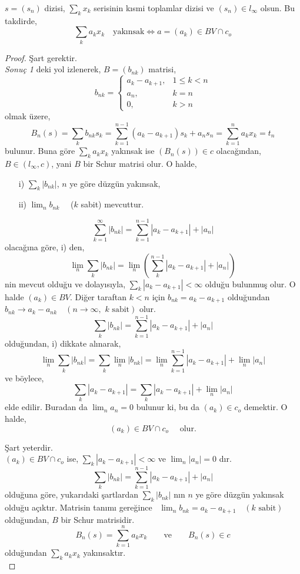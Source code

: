 \begin{corollary}
$s=(s_n)$ dizisi, $\sum\limits_kx_k$ serisinin kısmi toplamlar dizisi ve $(s_n)\in l_\infty$ olsun. Bu takdirde,
$$
\sum_ka_kx_k\quad\text{yakınsak}\iff a=(a_k)\in BV\cap c_o
$$ 
\end{corollary}
\begin{proof}
Şart gerektir.\\[5pt]

\emph{Sonuç 1} deki yol izlenerek, $B=(b_{nk})$ matrisi,
$$
b_{nk}=
\begin{cases}
a_k-a_{k+1}, & 1\leq k<n\\
a_n, & k=n\\
0, & k>n
\end{cases}
$$
olmak üzere,\
$$
B_n(s)=\sum_kb_{nk}s_k=\sum\limits_{k=1}^{n-1}(a_k-a_{k+1})s_k+a_ns_n=\sum\limits_{k=1}^na_kx_k=t_n
$$
bulunur. Buna göre $\sum\limits_ka_kx_k$ yakınsak ise $(B_n(s))\in c$ olacağından, $B\in(l_\infty, c)$, yani $B$ bir Schur matrisi olur. O halde,
\begin{itemize}
\item[i)] $\sum\limits_k|b_{nk}|$, $n$ ye göre düzgün yakınsak,
\item[ii)] $\lim_nb_{nk}\quad$ ($k$ sabit) mevcuttur.
\end{itemize}
$$
\sum\limits_{k=1}^\infty|b_{nk}|=\sum\limits_{k=1}^{n-1}|a_k-a_{k+1}|+|a_n|
$$
olacağına göre, i) den,
$$
\lim_n\sum_k|b_{nk}|=\lim_n\left(\sum\limits_k^{n-1}|a_k-a_{k+1}|+|a_n|\right)
$$
nin mevcut olduğu ve dolayısıyla, $\sum\limits_k|a_k-a_{k+1}|<\infty$ olduğu bulunmuş olur. O halde $(a_k)\in BV$. Diğer taraftan $k<n$ için $b_{nk}=a_k-a_{k+1}$ olduğundan $b_{nk}\to a_k-a_{nk}\quad(n\to\infty,\,\,k\text{ sabit})$ olur.
$$
\sum_k|b_{nk}|=\sum\limits_{k=1}^{n-1}|a_k-a_{k+1}|+|a_n|
$$
olduğundan, i) dikkate alınarak,
$$
\lim_n\sum_k|b_{nk}|=\sum_k\lim_n|b_{nk}|=\lim_n\sum\limits_{k=1}^{n-1}|a_k-a_{k+1}|+\lim_n|a_n|
$$
ve böylece,
$$
\sum_k|a_k-a_{k+1}|=\sum_k|a_k-a_{k+1}|+\lim_n|a_n|
$$
elde edilir. Buradan da $\lim_na_n=0$ bulunur ki, bu da $(a_k)\in c_o$ demektir. O halde,
$$
(a_k)\in BV\cap c_o\quad\text{ olur.}
$$

Şart yeterdir.\\[5pt]

$(a_k)\in BV\cap c_o$ ise, $\sum\limits_k|a_k-a_{k+1}|<\infty$ ve $\lim_n|a_n|=0$ dır.
$$
\sum_k|b_{nk}|=\sum\limits_{k=1}^{n-1}|a_k-a_{k+1}|+|a_n|
$$
olduğuna göre, yukarıdaki şartlardan $\sum\limits_k|b_{nk}|$ nın $n$ ye göre düzgün yakınsak olduğu açıktır. Matrisin tanımı gereğince $\,\,\,\lim_nb_{nk}=a_k-a_{k+1}\quad(k\text{ sabit})$ olduğundan, $B$ bir Schur matrisidir.
$$
B_n(s)=\sum_{k=1}^na_kx_k\qquad\text{ve}\qquad B_n(s)\in c
$$
olduğundan $\sum\limits_ka_kx_k$ yakınsaktır.\\[5pt] 
\end{proof}

